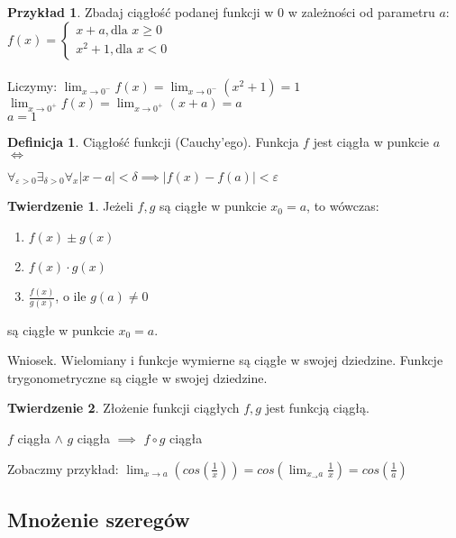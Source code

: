 \documentclass{article}
\theoremstyle{definition}
\newtheorem{de}{Definicja}[subsection]
\theoremstyle{definition}
\newtheorem{tw}{Twierdzenie}[subsection]
\theoremstyle{definition}
\newtheorem{pk}{Przykład}[subsection]
\theoremstyle{definition}
\begin{document}
\begin{pk}
    Zbadaj ciągłość podanej funkcji w $0$ w zależności od parametru $a$:\\
    $f(x)=
    \begin{cases}
        x+a, \text{dla } x\geq 0\\
        x^2+1, \text{dla } x < 0
    \end{cases}$\\\\
    Liczymy:
    $\lim_{x\rightarrow 0^{-}} f(x) = \lim_{x\rightarrow 0^{-}} (x^2+1) = 1$\\
    $\lim_{x\rightarrow 0^{+}} f(x) = \lim_{x\rightarrow 0^{+}} (x+a) = a$\\
    $a=1$
\end{pk}

\begin{de}
    Ciągłość funkcji (Cauchy'ego). Funkcja $f$ jest ciągła w punkcie $a$ $\iff$
    \begin{center}
        $\forall_{\varepsilon>0} \exists_{\delta>0} \forall_{x} |x-a|<\delta \implies |f(x)-f(a)|<\varepsilon$
    \end{center}
\end{de}

\begin{tw}
    Jeżeli $f, g$ są ciągłe w punkcie $x_0=a$, to wówczas:
    \begin{enumerate}
        \item $f(x)\pm g(x)$
        \item $f(x) \cdot g(x)$
        \item $\frac{f(x)}{g(x)}$, o ile $g(a)\neq 0$
    \end{enumerate}
    są ciągłe w punkcie $x_0=a$.
\end{tw}
Wniosek. Wielomiany i funkcje wymierne są ciągłe w swojej dziedzine.
Funkcje trygonometryczne są ciągłe w swojej dziedzine.

\begin{tw}
    Złożenie funkcji ciągłych $f,g$ jest funkcją ciągłą.
    \begin{center}
        $f$ ciągła $\land$ $g$ ciągła $\implies$ $f\circ g$ ciągła
    \end{center}
\end{tw}

Zobaczmy przykład:
$\lim_{x\rightarrow a} \left(cos\left(\frac{1}{x}\right)\right)=cos\left(\lim_{x_\rightarrow a} \frac{1}{x}\right) = cos\left(\frac{1}{a}\right)$

\subsection{Mnożenie szeregów}
\end{document}
